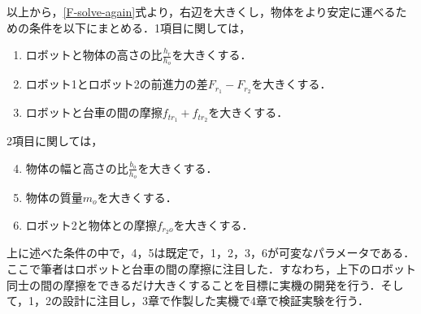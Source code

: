 以上から，\eqref{F-solve-again}式より，右辺を大きくし，物体をより安定に運べるための条件を以下にまとめる．1項目に関しては，
\begin{enumerate}
    \item ロボットと物体の高さの比$\frac{h_{r}}{h_{o}}$を大きくする．
    \item ロボット1とロボット2の前進力の差$F_{r_{1}}-F_{r_{2}}$を大きくする．
    \item ロボットと台車の間の摩擦$f_{t{r_1}}+f_{t{r_2}}$を大きくする． 
\end{enumerate}
2項目に関しては，
\begin{enumerate}
    \setcounter{enumi}{3}
    \item 物体の幅と高さの比$\frac{b_{o}}{h_{o}}$を大きくする．
    \item 物体の質量$m_{o}$を大きくする．
    \item ロボット2と物体との摩擦$f_{r_2 o}$を大きくする．  
\end{enumerate}
上に述べた条件の中で，4，5は既定で，1，2，3，6が可変なパラメータである．ここで筆者はロボットと台車の間の摩擦に注目した．すなわち，上下のロボット同士の間の摩擦をできるだけ大きくすることを目標に実機の開発を行う．そして，1，2の設計に注目し，3章で作製した実機で4章で検証実験を行う．


